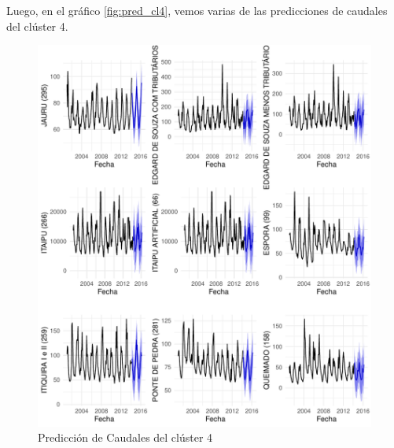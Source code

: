 \documentclass[12pt,oneside]{book}\usepackage[]{graphicx}\usepackage[]{color}
\makeatletter
\def\maxwidth{ %
  \ifdim\Gin@nat@width>\linewidth
    \linewidth
  \else
    \Gin@nat@width
  \fi
}
\newenvironment{knitrout}{}{} %
\theoremstyle{definition} %
\makeatother
\begin{document}
Luego, en el gráfico \ref{fig:pred_cl4}, vemos varias de las predicciones de caudales del clúster 4.

\begin{knitrout}
\color{fgcolor}\begin{figure}[h]

{\centering \includegraphics[width=\maxwidth]{figure/unnamed-chunk-94-1} 

}

\caption{\label{fig:pred_cl4} Predicción de Caudales del clúster 4}\label{fig:unnamed-chunk-94}
\end{figure}


\end{knitrout}


















\end{document}
